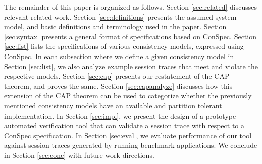\documentclass[journal,compsoc]{IEEEtran}
\begin{document}
The remainder of this paper is organized as follows. Section \ref{sec:related} discusses relevant related work. Section  \ref{sec:definitions} presents the assumed system model, and basic definitions and terminology used in the paper.  Section \ref{sec:syntax} presents a general format of specifications based on ConSpec. Section \ref{sec:list} lists the specifications of various  consistency models, expressed using ConSpec. In each subsection where we define a given consistency model in Section  \ref{sec:list}, we also  analyze example session traces that meet and violate the respective models.  %
 Section \ref{sec:cap} presents our restatement of the CAP theorem, %
  and proves the same.  Section \ref{sec:capanalyze} discusses how this extension of the CAP theorem can be used to categorize whether the previously mentioned consistency models have an available and partition tolerant implementation. %
 In Section \ref{sec:impl}, we present the design of a prototype automated verification tool that can validate a session trace with respect to a ConSpec specification. In Section  \ref{sec:eval}, we evaluate performance of our tool against session traces generated by running benchmark applications. We conclude in Section \ref{sec:conc} with future work directions.  %
 
\end{document}
